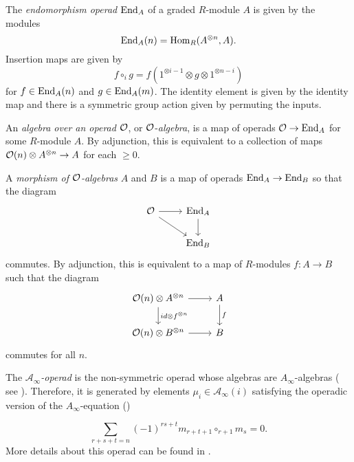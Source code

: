 \documentclass[Thesis.tex]{subfiles}
\begin{document}
\begin{defin}
The \emph{endomorphism operad} $\operatorname{End}_A$ of a graded $R$-module $A$ is given by the modules \[\operatorname{End}_A(n)=\operatorname{Hom}_R(A^{\otimes n},A).\] Insertion maps are given by
\[f\circ_i g=f(1^{\otimes i-1}\otimes g\otimes 1^{\otimes n-i})\]
for $f\in\operatorname{End}_A(n)$ and $g\in\operatorname{End}_A(m)$. The identity element is given by the identity map and there is a symmetric group action given by permuting the inputs.
\end{defin}
\begin{defin}
An \emph{algebra over an operad} ${\mathcal O}$, or ${\mathcal O}$-\emph{algebra}, is a map of operads ${\mathcal O}\to\operatorname{End}_A$ for some $R$-module $A$. By adjunction, this is equivalent to a collection of maps ${\mathcal O}(n)\otimes A^{\otimes n}\to A$ for each $\geq 0$.  
\end{defin}


\begin{defin}\label{algebramorphism}
A \emph{morphism of ${\mathcal O}$-algebras} $A$ and $B$ is a map of operads $\operatorname{End}_A\to\operatorname{End}_B$ so that the diagram
\[
\begin{tikzcd}
\OO \arrow[r]\arrow[dr] & \End_A\arrow[d]\\
& \End_B
\end{tikzcd}
\]
commutes. By adjunction, this is equivalent to a map of $R$-modules $f:A\to B$ such that the diagram
\[
\begin{tikzcd}
\OO(n)\otimes A^{\otimes n} \arrow[r]\arrow[d, "id\otimes f^{\otimes n}"] & A\arrow[d, "f"]\\
 \OO(n)\otimes B^{\otimes n}\arrow[r] & B
\end{tikzcd}
\]
commutes for all $n$.
\end{defin}

\begin{defin}
The \emph{$\mathcal{A}_\infty$-operad} is the non-symmetric operad whose algebras are $A_\infty$-algebras ( see ). Therefore, it is generated by elements $\mu_i\in\mathcal{A}_\infty(i)$ satisfying the operadic version of the $A_\infty$-equation ()

\begin{equation}\label{operadicainftyequation}
\sum_{r+s+t=n}(-1)^{rs+t}m_{r+t+1}\circ_{r+1}m_s=0.
\end{equation}
More details about this operad can be found in \cite[Chapter 9]{lodayvallette}.
\end{defin}
\end{document}
